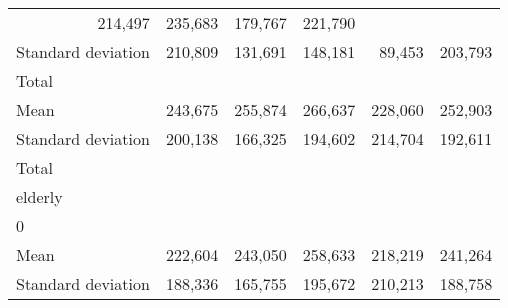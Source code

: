\begin{tabular}{llllll}
  \multicolumn{1}{r}{214,497} &
  \multicolumn{1}{r}{235,683} &
  \multicolumn{1}{r}{179,767} &
  \multicolumn{1}{r}{221,790} \\
\multicolumn{1}{l}{\hspace{4em}Standard deviation} &
  \multicolumn{1}{|r}{210,809} &
  \multicolumn{1}{r}{131,691} &
  \multicolumn{1}{r}{148,181} &
  \multicolumn{1}{r}{89,453} &
  \multicolumn{1}{r}{203,793} \\
\multicolumn{1}{l}{\hspace{3em}Total} &
  \multicolumn{1}{|r}{} &
  \multicolumn{1}{r}{} &
  \multicolumn{1}{r}{} &
  \multicolumn{1}{r}{} &
  \multicolumn{1}{r}{} \\
\multicolumn{1}{l}{\hspace{4em}Mean} &
  \multicolumn{1}{|r}{243,675} &
  \multicolumn{1}{r}{255,874} &
  \multicolumn{1}{r}{266,637} &
  \multicolumn{1}{r}{228,060} &
  \multicolumn{1}{r}{252,903} \\
\multicolumn{1}{l}{\hspace{4em}Standard deviation} &
  \multicolumn{1}{|r}{200,138} &
  \multicolumn{1}{r}{166,325} &
  \multicolumn{1}{r}{194,602} &
  \multicolumn{1}{r}{214,704} &
  \multicolumn{1}{r}{192,611} \\
\multicolumn{1}{l}{\hspace{1em}Total} &
  \multicolumn{1}{|r}{} &
  \multicolumn{1}{r}{} &
  \multicolumn{1}{r}{} &
  \multicolumn{1}{r}{} &
  \multicolumn{1}{r}{} \\
\multicolumn{1}{l}{\hspace{2em}elderly} &
  \multicolumn{1}{|r}{} &
  \multicolumn{1}{r}{} &
  \multicolumn{1}{r}{} &
  \multicolumn{1}{r}{} &
  \multicolumn{1}{r}{} \\
\multicolumn{1}{l}{\hspace{3em}0} &
  \multicolumn{1}{|r}{} &
  \multicolumn{1}{r}{} &
  \multicolumn{1}{r}{} &
  \multicolumn{1}{r}{} &
  \multicolumn{1}{r}{} \\
\multicolumn{1}{l}{\hspace{4em}Mean} &
  \multicolumn{1}{|r}{222,604} &
  \multicolumn{1}{r}{243,050} &
  \multicolumn{1}{r}{258,633} &
  \multicolumn{1}{r}{218,219} &
  \multicolumn{1}{r}{241,264} \\
\multicolumn{1}{l}{\hspace{4em}Standard deviation} &
  \multicolumn{1}{|r}{188,336} &
  \multicolumn{1}{r}{165,755} &
  \multicolumn{1}{r}{195,672} &
  \multicolumn{1}{r}{210,213} &
  \multicolumn{1}{r}{188,758} \\

\end{tabular}
